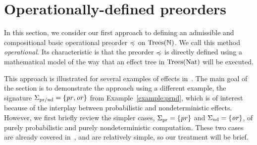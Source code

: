 \section{Operationally-defined preorders}

In this section, we consider our first approach to defining an admissible and compositional basic operational
preorder $\preccurlyeq$ on $\textnormal{Trees}(\mathbb{N})$. We call this method \emph{operational}. Its characteristic is that the preorder
 $\preccurlyeq$ is directly defined using a mathematical model of the way that an effect tree in $\textnormal{Trees}(\mathbb{\textnormal{Nat}})$ will be executed.

This approach is illustrated for several examples of effects in~\cite{gom}. 
The main goal of the section is to demonstrate the approach using a different example, the signature
$\Sigma_{\text{pr/nd}} = \{\operatorname{\mathit{pr}},\operatorname{\mathit{or}}\}$ from Example~\ref{example:prnd}, which is of interest because of the 
interplay between probabilistic and nondeterministic effects. However, we first
briefly review the simpler cases, $\Sigma_{\text{pr}} = \{\operatorname{\mathit{pr}}\}$ and $\Sigma_{\text{nd}} = \{\operatorname{\mathit{or}}\}$, of purely probabilistic and 
purely nondeterministic computation. These two cases are already covered in~\cite{gom}, and are 
relatively simple, so our treatment will be brief. 

